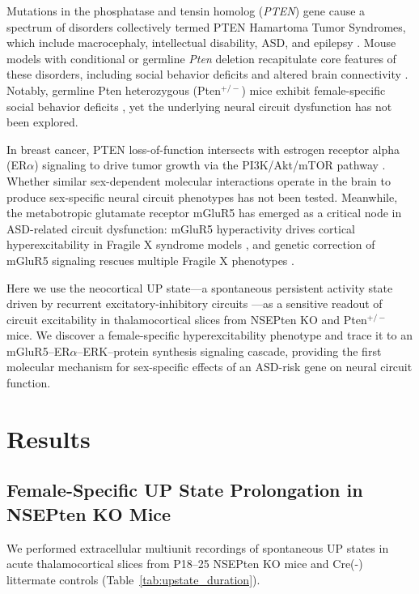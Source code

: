 \documentclass[11pt]{article}
\begin{document}
Mutations in the phosphatase and tensin homolog (\textit{PTEN}) gene cause a spectrum of disorders collectively termed PTEN Hamartoma Tumor Syndromes, which include macrocephaly, intellectual disability, ASD, and epilepsy \citep{butler2005subset}. Mouse models with conditional or germline \textit{Pten} deletion recapitulate core features of these disorders, including social behavior deficits and altered brain connectivity \citep{kwon2006pten}. Notably, germline Pten heterozygous (Pten$^{+/-}$) mice exhibit female-specific social behavior deficits \citep{clipperton2012pten, page2009haploinsufficiency}, yet the underlying neural circuit dysfunction has not been explored.

In breast cancer, PTEN loss-of-function intersects with estrogen receptor alpha (ER$\alpha$) signaling to drive tumor growth via the PI3K/Akt/mTOR pathway \citep{lee2003pten}. Whether similar sex-dependent molecular interactions operate in the brain to produce sex-specific neural circuit phenotypes has not been tested. Meanwhile, the metabotropic glutamate receptor mGluR5 has emerged as a critical node in ASD-related circuit dysfunction: mGluR5 hyperactivity drives cortical hyperexcitability in Fragile X syndrome models \citep{huber2002altered, hays2011altered, gibson2008imbalance}, and genetic correction of mGluR5 signaling rescues multiple Fragile X phenotypes \citep{dolen2007correction}.

Here we use the neocortical UP state---a spontaneous persistent activity state driven by recurrent excitatory-inhibitory circuits \citep{shu2005properties}---as a sensitive readout of circuit excitability in thalamocortical slices from NSEPten KO and Pten$^{+/-}$ mice. We discover a female-specific hyperexcitability phenotype and trace it to an mGluR5--ER$\alpha$--ERK--protein synthesis signaling cascade, providing the first molecular mechanism for sex-specific effects of an ASD-risk gene on neural circuit function.

\section{Results}

\subsection{Female-Specific UP State Prolongation in NSEPten KO Mice}

We performed extracellular multiunit recordings of spontaneous UP states in acute thalamocortical slices from P18--25 NSEPten KO mice and Cre(-) littermate controls (Table~\ref{tab:upstate_duration}).
\end{document}
